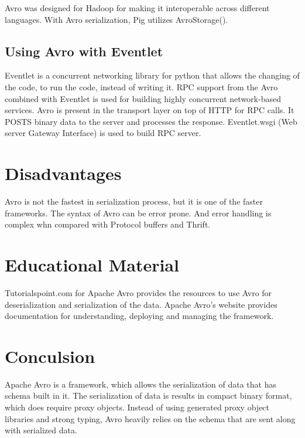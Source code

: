 \documentclass[9pt,twocolumn,twoside]{../../styles/osajnl}
\begin{document}
Avro was designed for Hadoop for making it interoperable across
different languages.  With Avro serialization, Pig utilizes
AvroStorage().

\subsection{Using Avro with Eventlet}

Eventlet\cite{www-using-avro} is a concurrent networking library for
python that allows the changing of the code, to run the code, instead
of writing it.  RPC support from the Avro combined with Eventlet is
used for building highly concurrent network-based services. Avro is
present in the transport layer on top of HTTP for RPC calls. It POSTS
binary data to the server and processes the response. Eventlet.wsgi
(Web server Gateway Interface) is used to build RPC server.

\section{Disadvantages}

Avro is not the fastest in serialization process, but it is one of the
faster frameworks.  The syntax of Avro can be error prone. And error
handling is complex whn compared with Protocol buffers and Thrift.

\section{Educational Material}

Tutorialspoint.com \cite{www-tutorialspoint-avro}for Apache Avro
provides the resources to use Avro for deserialization and
serialization of the data.  Apache Avro’s \cite{www-apache-avro}
website provides documentation for understanding, deploying and
managing the framework.

\section{Conculsion}

Apache Avro is a framework, which allows the serialization of data
that has schema built in it. The serialization of data is results in
compact binary format, which does require proxy objects. Instead of
using generated proxy object libraries and strong typing, Avro heavily
relies on the schema that are sent along with serialized data.


\end{document}
